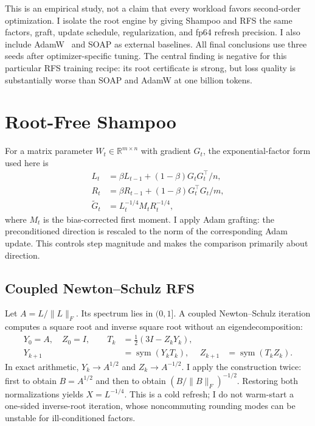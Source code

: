\documentclass[10pt]{article}
\newcommand{\RFS}{\textsc{RFS}}
\begin{document}
This is an empirical study, not a claim that every workload favors
second-order optimization. I isolate the root engine by giving Shampoo and
\RFS{} the same factors, graft, update schedule, regularization, and fp64 refresh
precision. I also include AdamW~\citep{loshchilov2019adamw} and SOAP as external
baselines. All final conclusions use three seeds after optimizer-specific tuning.
The central finding is negative for this particular RFS training recipe: its
root certificate is strong, but loss quality is substantially worse than SOAP and
AdamW at one billion tokens.

\section{Root-Free Shampoo}
For a matrix parameter $W_t\in\mathbb{R}^{m\times n}$ with gradient $G_t$, the
exponential-factor form used here is
\begin{align}
 L_t &= \beta L_{t-1} + (1-\beta)G_tG_t^\top/n,\\
 R_t &= \beta R_{t-1} + (1-\beta)G_t^\top G_t/m,\\
 \widetilde G_t &= L_t^{-1/4}M_tR_t^{-1/4},
\end{align}
where $M_t$ is the bias-corrected first moment. I apply Adam grafting: the
preconditioned direction is rescaled to the norm of the corresponding Adam update.
This controls step magnitude and makes the comparison primarily about direction.

\subsection{Coupled Newton--Schulz RFS}
Let $A=L/\lVert L\rVert_F$. Its spectrum lies in $(0,1]$. A coupled
Newton--Schulz iteration computes a square root and inverse square root without an
eigendecomposition:
\begin{align}
Y_0=A,\quad Z_0=I,\qquad
T_k&=\tfrac12(3I-Z_kY_k),\\
Y_{k+1}&=\operatorname{sym}(Y_kT_k),&
Z_{k+1}&=\operatorname{sym}(T_kZ_k).
\end{align}
In exact arithmetic, $Y_k\rightarrow A^{1/2}$ and $Z_k\rightarrow A^{-1/2}$. I
apply the construction twice: first to obtain $B=A^{1/2}$ and then to obtain
$(B/\lVert B\rVert_F)^{-1/2}$. Restoring both normalizations yields
$X=L^{-1/4}$. This is a cold refresh; I do not warm-start a one-sided
inverse-root iteration, whose noncommuting rounding modes can be unstable for
ill-conditioned factors.
\end{document}
